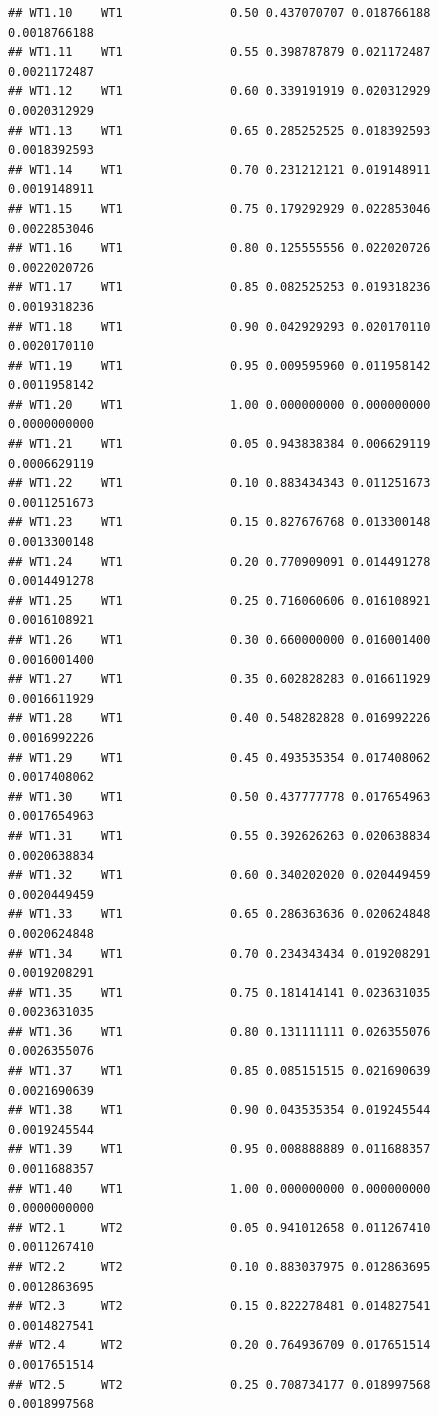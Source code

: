 \documentclass[
]{book}
\begin{document}
\begin{verbatim}
## WT1.10    WT1               0.50 0.437070707 0.018766188 0.0018766188
## WT1.11    WT1               0.55 0.398787879 0.021172487 0.0021172487
## WT1.12    WT1               0.60 0.339191919 0.020312929 0.0020312929
## WT1.13    WT1               0.65 0.285252525 0.018392593 0.0018392593
## WT1.14    WT1               0.70 0.231212121 0.019148911 0.0019148911
## WT1.15    WT1               0.75 0.179292929 0.022853046 0.0022853046
## WT1.16    WT1               0.80 0.125555556 0.022020726 0.0022020726
## WT1.17    WT1               0.85 0.082525253 0.019318236 0.0019318236
## WT1.18    WT1               0.90 0.042929293 0.020170110 0.0020170110
## WT1.19    WT1               0.95 0.009595960 0.011958142 0.0011958142
## WT1.20    WT1               1.00 0.000000000 0.000000000 0.0000000000
## WT1.21    WT1               0.05 0.943838384 0.006629119 0.0006629119
## WT1.22    WT1               0.10 0.883434343 0.011251673 0.0011251673
## WT1.23    WT1               0.15 0.827676768 0.013300148 0.0013300148
## WT1.24    WT1               0.20 0.770909091 0.014491278 0.0014491278
## WT1.25    WT1               0.25 0.716060606 0.016108921 0.0016108921
## WT1.26    WT1               0.30 0.660000000 0.016001400 0.0016001400
## WT1.27    WT1               0.35 0.602828283 0.016611929 0.0016611929
## WT1.28    WT1               0.40 0.548282828 0.016992226 0.0016992226
## WT1.29    WT1               0.45 0.493535354 0.017408062 0.0017408062
## WT1.30    WT1               0.50 0.437777778 0.017654963 0.0017654963
## WT1.31    WT1               0.55 0.392626263 0.020638834 0.0020638834
## WT1.32    WT1               0.60 0.340202020 0.020449459 0.0020449459
## WT1.33    WT1               0.65 0.286363636 0.020624848 0.0020624848
## WT1.34    WT1               0.70 0.234343434 0.019208291 0.0019208291
## WT1.35    WT1               0.75 0.181414141 0.023631035 0.0023631035
## WT1.36    WT1               0.80 0.131111111 0.026355076 0.0026355076
## WT1.37    WT1               0.85 0.085151515 0.021690639 0.0021690639
## WT1.38    WT1               0.90 0.043535354 0.019245544 0.0019245544
## WT1.39    WT1               0.95 0.008888889 0.011688357 0.0011688357
## WT1.40    WT1               1.00 0.000000000 0.000000000 0.0000000000
## WT2.1     WT2               0.05 0.941012658 0.011267410 0.0011267410
## WT2.2     WT2               0.10 0.883037975 0.012863695 0.0012863695
## WT2.3     WT2               0.15 0.822278481 0.014827541 0.0014827541
## WT2.4     WT2               0.20 0.764936709 0.017651514 0.0017651514
## WT2.5     WT2               0.25 0.708734177 0.018997568 0.0018997568

\end{verbatim}
\end{document}

